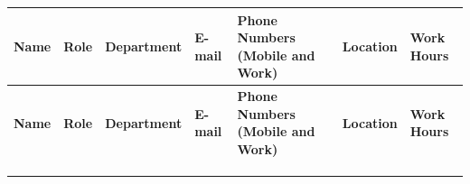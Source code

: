 \documentclass[10pt,letterpaper]{article}
\renewcommand\arraystretch{1.25}
\begin{document}
\begin{center}
\begingroup
\setlength\tabcolsep{2.0pt}
\scriptsize
\renewcommand\arraystretch{1.55}
\begin{longtable}{|>{\raggedright\arraybackslash}p{0.834in}|>{\raggedright\arraybackslash}p{0.834in}|>{\raggedright\arraybackslash}p{0.834in}|>{\raggedright\arraybackslash}p{0.834in}|>{\raggedright\arraybackslash}p{0.834in}|>{\raggedright\arraybackslash}p{0.834in}|>{\raggedright\arraybackslash}p{0.834in}|}
\hline
\rowcolor{light}
\textbf{Name} & \textbf{Role} & \textbf{Department} & \textbf{E-mail} & \textbf{Phone Numbers (Mobile and Work)} & \textbf{Location} & \textbf{Work Hours} \\ \hline
\endfirsthead
\hline\rowcolor{light} \textbf{Name} & \textbf{Role} & \textbf{Department} & \textbf{E-mail} & \textbf{Phone Numbers (Mobile and Work)} & \textbf{Location} & \textbf{Work Hours} \\ \hline
\endhead
\rule{0pt}{11pt}\hspace{0pt} & \rule{0pt}{11pt}\hspace{0pt} & \rule{0pt}{11pt}\hspace{0pt} & \rule{0pt}{11pt}\hspace{0pt} & \rule{0pt}{11pt}\hspace{0pt} & \rule{0pt}{11pt}\hspace{0pt} & \rule{0pt}{11pt}\hspace{0pt} \\ \hline
\rule{0pt}{11pt}\hspace{0pt} & \rule{0pt}{11pt}\hspace{0pt} & \rule{0pt}{11pt}\hspace{0pt} & \rule{0pt}{11pt}\hspace{0pt} & \rule{0pt}{11pt}\hspace{0pt} & \rule{0pt}{11pt}\hspace{0pt} & \rule{0pt}{11pt}\hspace{0pt} \\ \hline
\rule{0pt}{11pt}\hspace{0pt} & \rule{0pt}{11pt}\hspace{0pt} & \rule{0pt}{11pt}\hspace{0pt} & \rule{0pt}{11pt}\hspace{0pt} & \rule{0pt}{11pt}\hspace{0pt} & \rule{0pt}{11pt}\hspace{0pt} & \rule{0pt}{11pt}\hspace{0pt} \\ \hline

\end{longtable}
\end{center}
\end{document}
